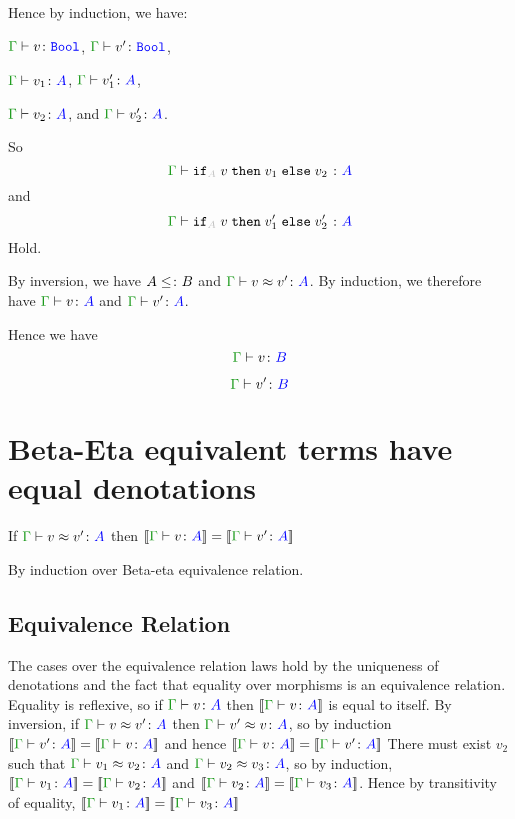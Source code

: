 \documentclass{report}
\begin{document}
Hence by induction, we have:

$\gtyperelation{v}{\B}$,
$\gtyperelation{v'}{\B}$,

$\gtyperelation{v_1}{ A}$,
$\gtyperelation{v_1'}{ A}$,


$\gtyperelation{v_2}{ A}$, and
$\gtyperelation{v_2'}{ A}$.

So 
\begin{equation}
    \gtyperelation{\pifthenelse{A}{v}{v_1}{v_2}}{ A}
\end{equation}
and
\begin{equation}
    \gtyperelation{\pifthenelse{A}{v}{v_1'}{v_2'}}{ A}
\end{equation}
Hold.

By inversion, we have $A \leq\colon B$ and $\gberelation{v}{v'}{A}$. By induction, we therefore have $\gtyperelation{v}{A}$ and $\gtyperelation{v'}{A}$.

Hence we have 
\begin{equation}
    \gtyperelation{v}{B}
\end{equation}


\begin{equation}
    \gtyperelation{v'}{B}
\end{equation}

\section{Beta-Eta equivalent terms have equal denotations}
If $\gberelation{v}{v'}{A}$ then $\gdenoequality{v}{v'}{A}$

By induction over Beta-eta equivalence relation.
\subsection{Equivalence Relation}
The cases over the equivalence relation laws hold by the uniqueness of denotations and the fact that equality over morphisms is an equivalence relation.
Equality is reflexive, so if $\gtyperelation{v}{A}$ then $\deno{\gtyperelation{v}{A}}$ is equal to itself.
By inversion, if $\gberelation{v}{v'}{A}$ then $\gberelation{v'}{v}{A}$, so by induction $\gdenoequality{v'}{v}{A}$ and hence $\gdenoequality{v}{v'}{A}$
There must exist $v_2$ such that $\gberelation{v_1}{v_2}{A}$ and $\gberelation{v_2}{v_3}{A}$, so by induction,
$\gdenoequality{v_1}{v_2}{A}$ and $\gdenoequality{v_2}{v_3}{A}$. Hence by transitivity of equality, $\gdenoequality{v_1}{v_3}{A}$
\end{document}
